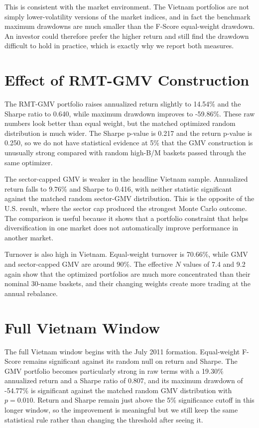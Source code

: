 \documentclass[11pt,a4paper]{report}
\numberwithin{figure}{chapter}
\numberwithin{table}{chapter}
\numberwithin{equation}{chapter}
\begin{document}
This is consistent with the market environment. The Vietnam portfolios are not simply lower-volatility versions of the market indices, and in fact the benchmark maximum drawdowns are much smaller than the F-Score equal-weight drawdown. An investor could therefore prefer the higher return and still find the drawdown difficult to hold in practice, which is exactly why we report both measures.

\section{Effect of RMT-GMV Construction}

The RMT-GMV portfolio raises annualized return slightly to 14.54\% and the Sharpe ratio to 0.640, while maximum drawdown improves to -59.86\%. These raw numbers look better than equal weight, but the matched optimized random distribution is much wider. The Sharpe p-value is 0.217 and the return p-value is 0.250, so we do not have statistical evidence at 5\% that the GMV construction is unusually strong compared with random high-B/M baskets passed through the same optimizer.

The sector-capped GMV is weaker in the headline Vietnam sample. Annualized return falls to 9.76\% and Sharpe to 0.416, with neither statistic significant against the matched random sector-GMV distribution. This is the opposite of the U.S. result, where the sector cap produced the strongest Monte Carlo outcome. The comparison is useful because it shows that a portfolio constraint that helps diversification in one market does not automatically improve performance in another market.

Turnover is also high in Vietnam. Equal-weight turnover is 70.66\%, while GMV and sector-capped GMV are around 90\%. The effective $N$ values of 7.4 and 9.2 again show that the optimized portfolios are much more concentrated than their nominal 30-name baskets, and their changing weights create more trading at the annual rebalance.

\section{Full Vietnam Window}

The full Vietnam window begins with the July 2011 formation. Equal-weight F-Score remains significant against its random null on return and Sharpe. The GMV portfolio becomes particularly strong in raw terms with a 19.30\% annualized return and a Sharpe ratio of 0.807, and its maximum drawdown of -54.77\% is significant against the matched random GMV distribution with $p=0.010$. Return and Sharpe remain just above the 5\% significance cutoff in this longer window, so the improvement is meaningful but we still keep the same statistical rule rather than changing the threshold after seeing it.
\end{document}
